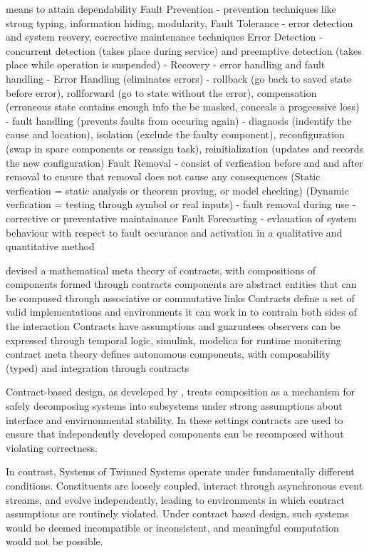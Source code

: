 \cite{avizienis2004basic}
means to attain dependability 
Fault Prevention
- prevention techniques like strong typing, information hiding, modularity, 
Fault Tolerance
- error detection and system reovery, corrective maintenance techniques
Error Detection -  concurrent detection (takes place during service) and preemptive detection (takes place while operation is suspended)
- Recovery - error handling and fault handling
- Error Handling (eliminates errors) - rollback (go back to saved state before error), rollforward (go to state without the error), compensation (erroneous state contains enough info the be masked, conceals a progeessive loss)
- fault handling (prevents faults from occuring again) - diagnosis (indentify the cause and location), isolation (exclude the faulty component), reconfiguration (swap in spare components or reassign task), reinitialization (updates and records the new configuration)
Fault Removal 
- consist of verfication before and and after removal to ensure that removal does not cause any consequences (Static verfication =  static analysis or theorem proving, or model checking) (Dynamic verfication = testing through symbol or real inputs)
- fault removal during use - corrective or preventative maintainance
Fault Forecasting
- evlauation of system behaviour with respect to fault occurance and activation in a qualitative and quantitative method


\cite{benveniste2012contracts}
devised a mathematical meta theory of contracts, with compositions of components formed through contracts
components are abstract entities that can be compused through associative or commutative links
Contracts define a set of valid implementations and environments it can work in to contrain both sides of the interaction
Contracts have assumptions and guaruntees
observers can be expressed through temporal logic, simulink, modelica for runtime monitering
contract meta theory defines autonomous components, with composability (typed) and integration through contracts

Contract-based design, as developed by \citet{benveniste2012contracts}, treats composition as a mechanism for safely decomposing systems into subsystems under strong assumptions about interface and envirnonmental stability. In these settings contracts are used to ensure that independently developed components can be recomposed without violating correctness.

In contrast, Systems of Twinned Systems operate under fundamentally different conditions. Constituents are loosely coupled, interact through asynchronous event streams, and evolve independently, leading to environments in which contract assumptions are routinely violated. Under contract based design, such systems would be deemed incompatible or inconsistent, and meaningful computation would not be possible.

